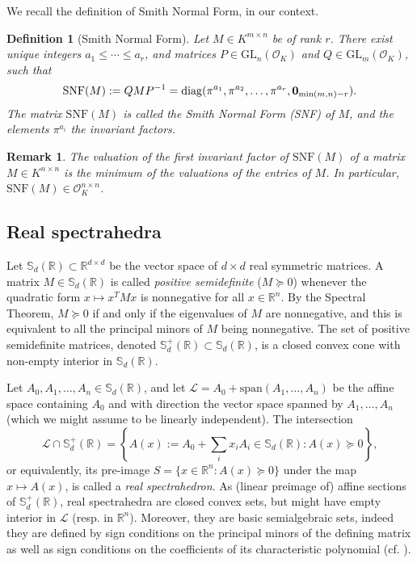 \documentclass[a4paper,12pt]{article}
\newtheorem{definition}[theorem]{Definition}
\newtheorem{remark}[theorem]{Remark}
\newcommand{\R}{\mathbb{R}} %
\newcommand{\sym}{\mathbb{S}} %
\renewcommand{\span}[1]{{\text{span}(#1)}} %
\newcommand{\calL}{\mathcal{L}} %
\newcommand{\OK}{\mathcal{O}_K}
\def\diag{\mathrm{diag}}
\newcommand{\GL}{\mathrm{GL}}
\begin{document}
We recall the definition of Smith Normal Form, in our context.
\begin{definition}[Smith Normal Form]\label{smith_nf}
  Let $M \in K^{m \times n}$ be of rank $r$. There exist unique integers $a_1 \leq \cdots \leq a_r$, and
  matrices $P \in \GL_n(\OK)$ and $Q \in \GL_m(\OK)$, such that
  $$
  \mathrm{SNF}(M) := QMP^{-1} = \diag(\pi^{a_1}, \pi^{a_2}, \ldots, \pi^{a_r}, {\bf 0}_{\min(m,n)-r}).
  $$
  The matrix $\mathrm{SNF}(M)$ is called the \emph{Smith Normal Form (SNF)} of $M$, and the elements $\pi^{a_i}$ the
  \emph{invariant factors}.
\end{definition}
\begin{remark}
  The valuation of the first invariant factor of $\mathrm{SNF}(M)$ of a matrix
  $M \in K^{n \times n}$ is the minimum of the valuations of the entries of
  $M$. In particular, $\mathrm{SNF}(M) \in \OK^{n \times n}$.
\end{remark}


\subsection{Real spectrahedra}

Let $\sym_d(\R) \subset \R^{d\times d}$ be the vector space of $d \times d$ real symmetric
matrices. A matrix $M \in \sym_d(\R)$
is called \emph{positive semidefinite} ($M \succeq 0$) whenever the quadratic
form $x \mapsto x^TMx$ is nonnegative for all $x\in \R^n$. By the Spectral Theorem, $M \succeq 0$
if and only if the eigenvalues of $M$ are nonnegative, and this is equivalent to all the principal minors
of $M$ being nonnegative. The set of positive semidefinite matrices, denoted $\sym_d^+(\R) \subset \sym_d(\R)$,
is a closed convex cone with non-empty interior in $\sym_d(\R)$.

Let $A_0,A_1,\ldots,A_n \in \sym_d(\R)$, and let $\calL = A_0+\span{A_1,\ldots,A_n}$ be the affine space
containing $A_0$ and with direction the vector space spanned by $A_1,\ldots,A_n$ (which we might assume
to be linearly independent). The intersection
$$
\calL \cap \sym_d^+(\R) = \left\{A(x) := A_0+\sum_i x_i A_i \in \sym_d(\R) :
A(x) \succeq 0\right\},
$$
or equivalently, its pre-image $S = \{x \in \R^n : A(x) \succeq 0\}$ under the map $x \mapsto A(x)$, is called
a \emph{real spectrahedron}. As (linear preimage of) affine sections of $\sym_d^+(\R)$, real spectrahedra
are closed convex sets, but might have empty interior in $\calL$ (resp. in $\R^n$).
Moreover, they are basic semialgebraic sets, indeed they are defined by sign conditions on the principal
minors of the defining matrix as well as sign conditions on the coefficients of its characteristic polynomial
(cf. ).
\end{document}
